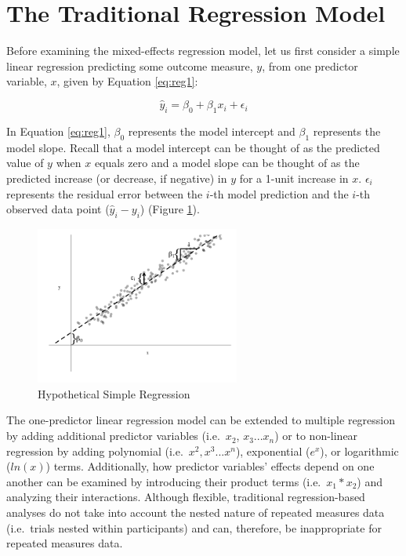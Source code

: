 \documentclass[
]{article}
\begin{document}
\hypertarget{the-traditional-regression-model}{%
\section{The Traditional Regression Model}\label{the-traditional-regression-model}}

Before examining the mixed-effects regression model, let us first consider a simple linear regression predicting some outcome measure, \(y\), from one predictor variable, \(x\), given by Equation \ref{eq:reg1}:

\begin{equation}
\hat{y}_{i}=\beta_{0}+\beta_{1}x_{i}+\epsilon_{i}
\label{eq:reg1}
\end{equation}

\noindent
In Equation \ref{eq:reg1}, \(\beta_{0}\) represents the model intercept and \(\beta_{1}\) represents the model slope. Recall that a model intercept can be thought of as the predicted value of \(y\) when \(x\) equals zero and a model slope can be thought of as the predicted increase (or decrease, if negative) in \(y\) for a 1-unit increase in \(x\). \(\epsilon_{i}\) represents the residual error between the \(i\)-th model prediction and the \(i\)-th observed data point (\(\hat{y}_{i}-y_{i}\)) (Figure \ref{fig1}).

\begin{figure}
\centering
\captionsetup{width=0.6\textwidth}
\includegraphics[width=0.6\textwidth]{fig1.png}
\caption{Hypothetical Simple Regression}
\label{fig1}
\end{figure}

The one-predictor linear regression model can be extended to multiple regression by adding additional predictor variables (i.e.~\(x_{2}\), \(x_{3}...x_{n}\)) or to non-linear regression by adding polynomial (i.e.~\(x^{2}, x^{3}...x^{n}\)), exponential (\(e^{x}\)), or logarithmic (\(ln(x)\)) terms. Additionally, how predictor variables' effects depend on one another can be examined by introducing their product terms (i.e.~\(x_{1}*x_{2}\)) and analyzing their interactions. Although flexible, traditional regression-based analyses do not take into account the nested nature of repeated measures data (i.e.~trials nested within participants) and can, therefore, be inappropriate for repeated measures data.
\end{document}
